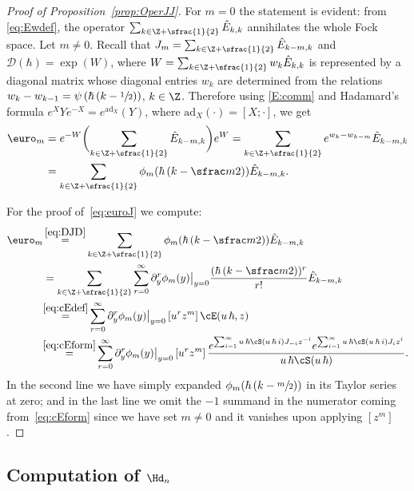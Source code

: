 \begin{proof}[Proof of Proposition~\ref{prop:OperJJ}] For $m=0$ the statement is evident: from \eqref{eq:Ewdef}, the operator $\sum_{k\in\Z+\sfrac{1}{2}}\hat E_{k,k}$ annihilates the whole Fock space. Let $m\neq 0$. Recall that $J_m=\sum_{k\in\Z+\sfrac{1}{2}}\hat{E}_{k-m,k}$ and
$
\mathcal{D}(\hbar)=\exp(W)
$,
where $W=\sum_{k\in \Z+\sfrac{1}{2}}w_k \hat E_{k,k}$ is represented by a diagonal matrix whose diagonal entries $w_k$ are determined from the relations
$w_{k}-w_{k-1}=\psi\left(\hbar\,(k-\sfrac{1}{2})\right)$, $k\in\Z$.
Therefore
using \eqref{E:comm} and Hadamard's formula $e^XY e^{-X} = e^{\mathrm{ad}_X}(Y)$, where $\mathrm{ad}_X(\cdot) =[X;\cdot]$, we get
\begin{align*}
\euro_m & =e^{-W}\biggl(\sum_{k\in\Z+\sfrac{1}{2}}\hat{E}_{k-m,k}\biggr) e^{W}
=\sum_{k\in\Z+\sfrac{1}{2}}e^{w_k-w_{k-m}}\hat{E}_{k-m,k}
\\
& =\sum_{k\in\Z+\sfrac{1}{2}}\phi_m(\hbar\,(k-\sfrac m2))\hat{E}_{k-m,k}.
\end{align*}

For the proof of~\eqref{eq:euroJ} we compute:
\begin{align*}
\euro_m
&\mathop{=}^{\eqref{eq:DJD}}
\sum_{k\in\Z+\sfrac{1}{2}}\phi_m(\hbar\,(k-\sfrac m2))\hat{E}_{k-m,k}
\\
&=
\sum_{k\in\Z+\sfrac{1}{2}}\sum_{r=0}^\infty\partial_y^r\phi_m(y)\big|_{y=0}
\frac{(\hbar\,(k-\sfrac m2))^r}{r!}\hat{E}_{k-m,k}
\\
&\!\mathop{=}^{\eqref{eq:cEdef}}
\sum_{r=0}^\infty\partial_y^r\phi_m(y)\big|_{y=0}\,[u^rz^m]\,\cE(u\,\hbar,z)
\\
&\!\mathop{=}^{\eqref{eq:cEform}}
\sum_{r=0}^\infty\partial_y^r\phi_m(y)\big|_{y=0}\,[u^rz^m]\,
\frac{
e^{\sum_{i=1}^\infty u\,\hbar\cS(u\,\hbar\,i) J_{-i}z^{-i}}
e^{\sum_{i=1}^\infty u\,\hbar \cS(u\,\hbar\,i) J_{i}z^{i}}}
{u\,\hbar\cS(u\,\hbar)}.
\end{align*}
In the second line we have simply expanded $\phi_m(\hbar\,(k-\sfrac m2))$ in its Taylor series at zero; and in the last line we omit the $-1$ summand in the numerator coming from~\eqref{eq:cEform} since we have set $m\neq 0$ and it vanishes upon applying $[z^m]$.
\end{proof}

\subsection{Computation of \texorpdfstring{$\Hd_n$}{Hn disconnected}}


